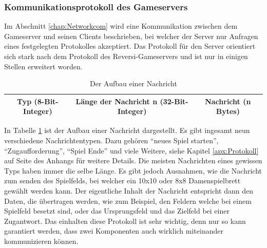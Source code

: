 \documentclass[12pt,a4paper,bibliography=totocnumbered,listof=totocnumbered]{article}
\begin{document}
\subsubsection{Kommunikationsprotokoll des Gameservers}
Im Abschnitt \ref{chap:Networkcom} wird eine Kommunikation zwischen dem Gameserver und seinen Clients beschrieben, bei welcher der 
Server nur Anfragen eines festgelegten Protokolles akzeptiert. Das Protokoll für den Server orientiert sich stark nach dem Protokoll
des Reversi-Gameservers und ist nur in einigen Stellen erweitert worden.
%
\begin{table}[H]
    \centering
    \begin{tabular} {|c|c|c|}
        \hline
        Typ (8-Bit-Integer) & Länge der Nachricht n (32-Bit-Integer) & Nachricht (n Bytes) \\
        \hline
    \end{tabular}
	\caption{Der Aufbau einer Nachricht}
    \label{tab:Nachritenaufbau}
\end{table}

In Tabelle \ref{tab:Nachritenaufbau} ist der Aufbau einer Nachricht dargestellt. Es gibt ingesamt neun verschiedene Nachrichtentypen. Dazu gehören 
``neues Spiel starten'', ``Zugaufforderung'', ``Spiel Ende'' und viele Weitere, siehe Kapitel \ref{apx:Protokoll} auf Seite \pageref{apx:Protokoll} des Anhangs für weitere Details. 
Die meisten Nachrichten eines gewissen Typs haben immer die selbe Länge. Es gibt jedoch
Ausnahmen, wie die Nachricht zum senden des Spielfelds, bei welcher ein 10x10 oder 8x8 Damenspielbrett gewählt werden kann. Der eigentliche Inhalt der Nachricht entspricht dann 
den Daten, die übertragen werden, wie zum Beispiel, den Feldern welche bei einem Spielfeld besetzt sind, oder das Ursprungsfeld und das Zielfeld bei einer Zugantwort. 
Das einhalten diese Protokoll ist sehr wichtig, denn nur so kann garantiert werden, dass zwei Komponenten auch wirklich miteinander kommunizieren können.
\end{document}
